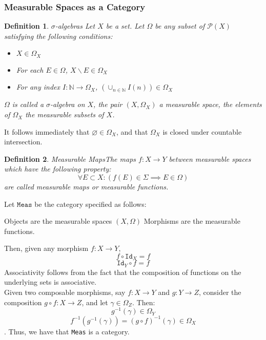 \documentclass{article}
\newtheorem{definition}{Definition}
\begin{document}
\subsubsection{Measurable Spaces as a Category}
\begin{definition}{$\sigma{}$-algebras}
Let $X$ be a set.  Let $\Omega$ be any subset of $\mathcal{P}(X)$ satisfying the following conditions:
\begin{itemize}
    \item $X\in\Omega_{X}$
    \item For each $E\in\Omega$, $X\backslash E\in\Omega_{X}$
    \item For any index $I: \mathbb{N}\rightarrow\Omega_{X}$, $(\cup_{n\in\mathbb{N}}I(n))\in\Omega_{X}$
\end{itemize} $\Omega$ is called a $\sigma$\textit{-algebra} on $X$, the pair $(X,\Omega_{X})$ a \textit{measurable space}, the elements of $\Omega_{X}$ the \textit{measurable subsets} of $X$.  
\end{definition}
It follows immediately that $\varnothing\in\Omega_{X}$, and that $\Omega_{X}$ is closed under countable intersection.\\
\begin{definition}{Measurable Maps}The maps $f: X\rightarrow Y$ between measurable spaces which have the following property: 
\begin{equation*}
    \forall E\subset X: (f(E)\in\Sigma\implies E\in\Omega) 
\end{equation*}
are called \textit{measurable maps} or \textit{measurable functions}.
\end{definition}
Let $\texttt{Meas}$ be the category specified as follows:
\begin{outline}
    \1 Objects are the measurable spaces $(X,\Omega)$
    \1 Morphisms are the measurable functions.
\end{outline}
Then, given any morphism $f: X\rightarrow{}Y$,
\begin{equation*}
    f\circ\texttt{Id}_X = f
\end{equation*}
\begin{equation*}
    \texttt{Id}_Y\circ{}f = f
\end{equation*}
Associativity follows from the fact that the composition of functions on the underlying sets is associative.\\Given two composable morphisms, say $f: X\rightarrow{}Y$ and $g:Y\rightarrow{}Z$, consider the composition $g\circ f: X\rightarrow{}Z$, and let $\gamma\in\Omega_{Z}$.  Then:
\begin{equation*}
    g^{-1}(\gamma) \in \Omega_{Y}
\end{equation*}
\begin{equation*}
    f^{-1}(g^{-1}(\gamma)) = (g\circ f)^{-1}(\gamma) \in\Omega_{X}
\end{equation*}.
Thus, we have that \texttt{Meas} is a category.
\end{document}
